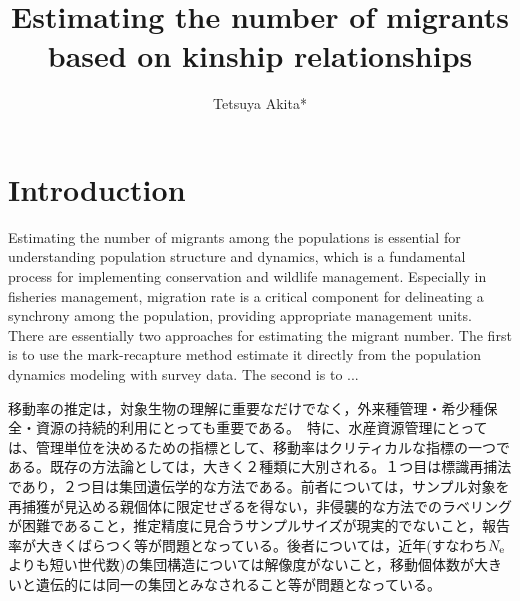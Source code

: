 \documentclass[AMA,STIX1COL]{WileyNJD-v2}
\begin{document}
\title{Estimating the number of migrants based on kinship relationships}%

\author[1]{Tetsuya Akita*}



\address[1]{, , }





\maketitle



\section{Introduction}\label{sec1}

Estimating the number of migrants among the populations is essential for understanding population structure and dynamics, which is a fundamental process for implementing conservation and wildlife management. Especially in fisheries management, migration rate is a critical component for delineating a synchrony among the population, providing appropriate management units. There are essentially two approaches for estimating the migrant number. The first is to use the mark-recapture method estimate it directly from the population dynamics modeling with survey data. The second is to ...

移動率の推定は，対象生物の理解に重要なだけでなく，外来種管理・希少種保全・資源の持続的利用にとっても重要である。　特に、水産資源管理にとっては、管理単位を決めるための指標として、移動率はクリティカルな指標の一つである。既存の方法論としては，大きく２種類に大別される。１つ目は標識再捕法であり，２つ目は集団遺伝学的な方法である。前者については，サンプル対象を再捕獲が見込める親個体に限定せざるを得ない，非侵襲的な方法でのラベリングが困難であること，推定精度に見合うサンプルサイズが現実的でないこと，報告率が大きくばらつく等が問題となっている。後者については，近年(すなわち$N_{\rm e}$よりも短い世代数)の集団構造については解像度がないこと，移動個体数が大きいと遺伝的には同一の集団とみなされること等が問題となっている。
\end{document}

